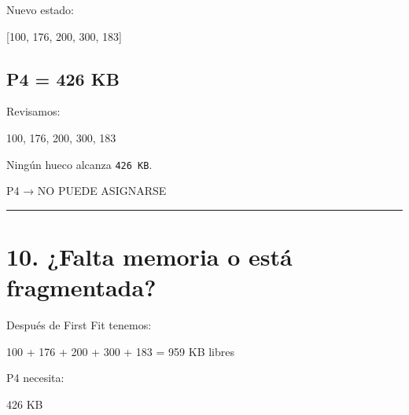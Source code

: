 \documentclass[
  spanish,
  letterpaper,
]{scrbook}
\newenvironment{Shaded}{\begin{snugshade}}{\end{snugshade}}
\newcommand{\NormalTok}[1]{\textcolor[rgb]{0.00,0.23,0.31}{#1}}
\begin{document}
Nuevo estado:

\begin{Shaded}
\begin{Highlighting}[]
\NormalTok{[100, 176, 200, 300, 183]}
\end{Highlighting}
\end{Shaded}

\section{P4 = 426 KB}\label{p4-426-kb-3}

Revisamos:

\begin{Shaded}
\begin{Highlighting}[]
\NormalTok{100, 176, 200, 300, 183}
\end{Highlighting}
\end{Shaded}

Ningún hueco alcanza \texttt{426\ KB}.

\begin{Shaded}
\begin{Highlighting}[]
\NormalTok{P4 → NO PUEDE ASIGNARSE}
\end{Highlighting}
\end{Shaded}

\begin{center}\rule{0.5\linewidth}{0.5pt}\end{center}


\chapter{10. ¿Falta memoria o está
fragmentada?}\label{falta-memoria-o-estuxe1-fragmentada-1}

Después de First Fit tenemos:

\begin{Shaded}
\begin{Highlighting}[]
\NormalTok{100 + 176 + 200 + 300 + 183 = 959 KB libres}
\end{Highlighting}
\end{Shaded}

P4 necesita:

\begin{Shaded}
\begin{Highlighting}[]
\NormalTok{426 KB}
\end{Highlighting}
\end{Shaded}
\end{document}
